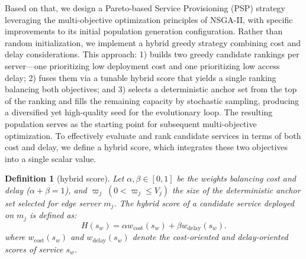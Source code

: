 \documentclass[10pt, conference, letterpaper]{IEEEtran}
\newtheorem{definition}{\textbf{Definition}}
\begin{document}
Based on that, we design a Pareto-based Service Provisioning (PSP) strategy leveraging the multi-objective optimization principles of NSGA-II, with specific improvements to its initial population generation configuration. Rather than random initialization, we implement a hybrid greedy strategy combining cost and delay considerations.  This approach: 1) builds two greedy candidate rankings per server---one prioritizing low deployment cost and
  one prioritizing low access delay; 2) fuses them via a tunable hybrid score that yields a single ranking
  balancing both objectives; and 3) selects a deterministic anchor set from the top of the ranking and fills the
   remaining capacity by stochastic sampling, producing a diversified yet high-quality seed for the evolutionary
   loop. The resulting population serves as the starting point for subsequent multi-objective optimization. To effectively evaluate and rank candidate services in terms of both cost and delay, we define a hybrid score, which integrates these two objectives into a single scalar value.
\begin{definition}[hybrid score]\label{def:init_pop}
Let $\alpha,\beta\in[0,1]$ be the weights balancing cost and delay ($\alpha+\beta=1$), and $\varpi_j \;(0<\varpi_j\le V_j)$ the size of the deterministic anchor set selected for edge server $m_j$. The hybrid score of a candidate service deployed on $m_j$ is defined as: 
\begin{equation}
H(s_w)=\alpha w_{\mathrm{cost}}(s_w)+\beta w_{\mathrm{delay}}(s_w).
\end{equation}
where $w_{\mathrm{cost}}(s_w)$ and $w_{\mathrm{delay}}(s_w)$ denote the cost-oriented and delay-oriented scores of service $s_w$. 
\end{definition}
\end{document}
